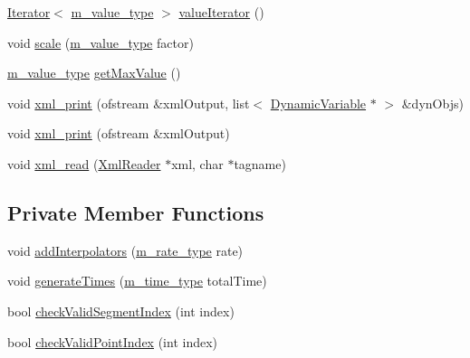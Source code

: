 \begin{CompactItemize}
\item 
\hyperlink{classIterator}{Iterator}$<$ \hyperlink{Types_8h_a3}{m\_\-value\_\-type} $>$ \hyperlink{classDynamicVariableSequence_a24}{value\-Iterator} ()
\item 
void \hyperlink{classDynamicVariableSequence_a25}{scale} (\hyperlink{Types_8h_a3}{m\_\-value\_\-type} factor)
\item 
\hyperlink{Types_8h_a3}{m\_\-value\_\-type} \hyperlink{classDynamicVariableSequence_a26}{get\-Max\-Value} ()
\item 
void \hyperlink{classDynamicVariableSequence_a27}{xml\_\-print} (ofstream \&xml\-Output, list$<$ \hyperlink{classDynamicVariable}{Dynamic\-Variable} $\ast$ $>$ \&dyn\-Objs)
\item 
void \hyperlink{classDynamicVariableSequence_a28}{xml\_\-print} (ofstream \&xml\-Output)
\item 
void \hyperlink{classDynamicVariableSequence_a29}{xml\_\-read} (\hyperlink{classXmlReader}{Xml\-Reader} $\ast$xml, char $\ast$tagname)
\end{CompactItemize}
\subsection*{Private Member Functions}
\begin{CompactItemize}
\item 
void \hyperlink{classDynamicVariableSequence_d0}{add\-Interpolators} (\hyperlink{Types_8h_a4}{m\_\-rate\_\-type} rate)
\item 
void \hyperlink{classDynamicVariableSequence_d1}{generate\-Times} (\hyperlink{Types_8h_a2}{m\_\-time\_\-type} total\-Time)
\item 
bool \hyperlink{classDynamicVariableSequence_d2}{check\-Valid\-Segment\-Index} (int index)
\item 
bool \hyperlink{classDynamicVariableSequence_d3}{check\-Valid\-Point\-Index} (int index)
\end{CompactItemize}
